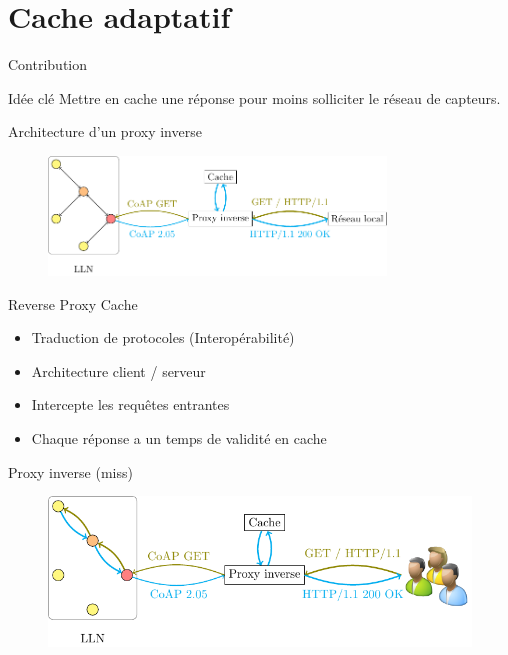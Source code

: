 \section{Cache adaptatif} %
\label{sec:cache_adaptatif}

\begin{frame}{Contribution}
  \begin{figure}
    \centering
    
  \end{figure}

  \begin{alertblock}{Idée clé}
    Mettre en cache une réponse pour moins solliciter le réseau de capteurs.
  \end{alertblock}

\end{frame}

\begin{frame}{Architecture d'un proxy inverse}
  \begin{figure}
    \centering
    \includegraphics[width=0.8\textwidth]{figures/schema_rpc_slides.pdf}
  \end{figure}

  \begin{block}{Reverse Proxy Cache}
    \begin{itemize}
      \item Traduction de protocoles (Interopérabilité)
      \item Architecture client / serveur
      \item Intercepte les requêtes entrantes
      \item Chaque réponse a un temps de validité en cache
    \end{itemize}
    \end{block}
\end{frame}

\begin{frame}{Proxy inverse (miss)}
  \begin{figure}
    \centering
    \includegraphics[width=\textwidth]{figures/schema_rpc_miss_slides.pdf}
  \end{figure}
\end{frame}


